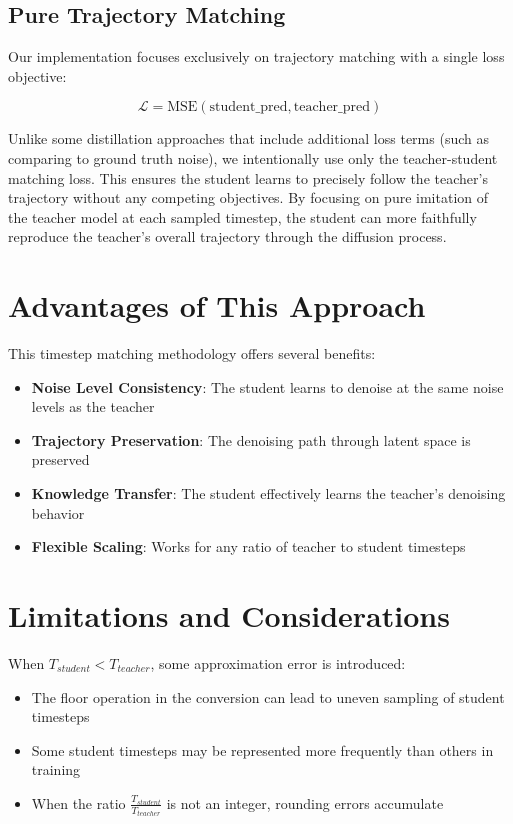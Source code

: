 \documentclass{article}
\begin{document}
\subsection{Pure Trajectory Matching}

Our implementation focuses exclusively on trajectory matching with a single loss objective:

\begin{equation}
\mathcal{L} = \text{MSE}(\text{student\_pred}, \text{teacher\_pred})
\end{equation}

Unlike some distillation approaches that include additional loss terms (such as comparing to ground truth noise), we intentionally use only the teacher-student matching loss. This ensures the student learns to precisely follow the teacher's trajectory without any competing objectives. By focusing on pure imitation of the teacher model at each sampled timestep, the student can more faithfully reproduce the teacher's overall trajectory through the diffusion process.

\section{Advantages of This Approach}

This timestep matching methodology offers several benefits:

\begin{itemize}
  \item \textbf{Noise Level Consistency}: The student learns to denoise at the same noise levels as the teacher
  \item \textbf{Trajectory Preservation}: The denoising path through latent space is preserved
  \item \textbf{Knowledge Transfer}: The student effectively learns the teacher's denoising behavior
  \item \textbf{Flexible Scaling}: Works for any ratio of teacher to student timesteps
\end{itemize}

\section{Limitations and Considerations}

When $T_{student} < T_{teacher}$, some approximation error is introduced:

\begin{itemize}
  \item The floor operation in the conversion can lead to uneven sampling of student timesteps
  \item Some student timesteps may be represented more frequently than others in training
  \item When the ratio $\frac{T_{student}}{T_{teacher}}$ is not an integer, rounding errors accumulate
\end{itemize}
\end{document}
